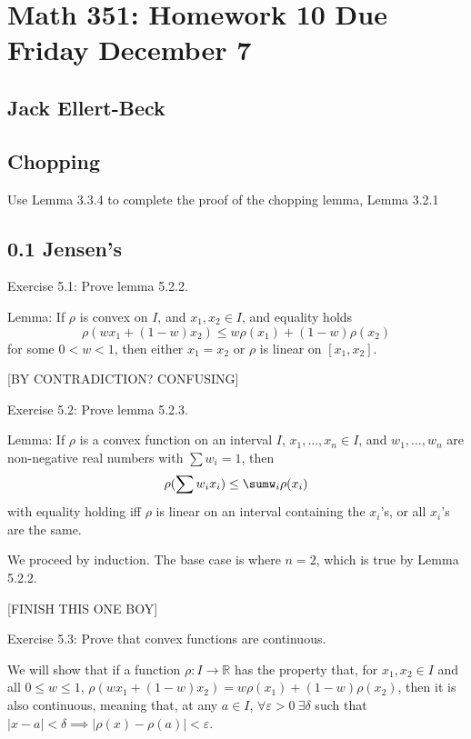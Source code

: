 \documentclass[11pt]{article}
\newcommand{\R}{\mathbb{R}}
\begin{document}
\setlength{\parindent}{0pt}
\setlength{\parskip}{9pt}


\section*{Math 351: Homework 10  Due Friday December 7}
\subsection*{Jack Ellert-Beck}

\bigskip

\subsection*{Chopping}

Use Lemma 3.3.4 to complete the proof of the chopping lemma, Lemma 3.2.1

\subsection*{0.1 Jensen's}

Exercise 5.1: Prove lemma 5.2.2.

Lemma: If $\rho$ is convex on $I$, and $x_1,x_2\in I$, and equality holds
\[
    \rho(wx_1+(1-w)x_2)\leq w\rho(x_1)+(1-w)\rho(x_2)
\]
for some $0<w<1$, then either $x_1=x_2$ or $\rho$ is linear on $[x_1,x_2]$.

[BY CONTRADICTION? CONFUSING]

Exercise 5.2: Prove lemma 5.2.3.

Lemma: If $\rho$ is a convex function on an interval $I$,
$x_1,\ldots,x_n\in I$,
and $w_1,\ldots,w_n$ are non-negative real numbers with $\sum w_i=1$, then
\[
    \rho(\sum w_ix_i)\leq\sumw_i\rho(x_i)
\]
with equality holding iff $\rho$ is linear on an interval containing the
$x_i$'s, or all $x_i$'s are the same.

We proceed by induction. The base case is where $n=2$, which is true by
Lemma 5.2.2.

[FINISH THIS ONE BOY]

Exercise 5.3: Prove that convex functions are continuous.

We will show that if a function $\rho:I\to\R$ has the property that, for
$x_1,x_2\in I$ and all $0\leq w\leq1$,
$\rho(wx_1+(1-w)x_2)=w\rho(x_1)+(1-w)\rho(x_2)$,
then it is also continuous, meaning that, at any $a\in I$,
$\forall \varepsilon>0\ \exists\delta$ such that
$|x-a|<\delta\implies|\rho(x)-\rho(a)|<\varepsilon$.
\end{document}
